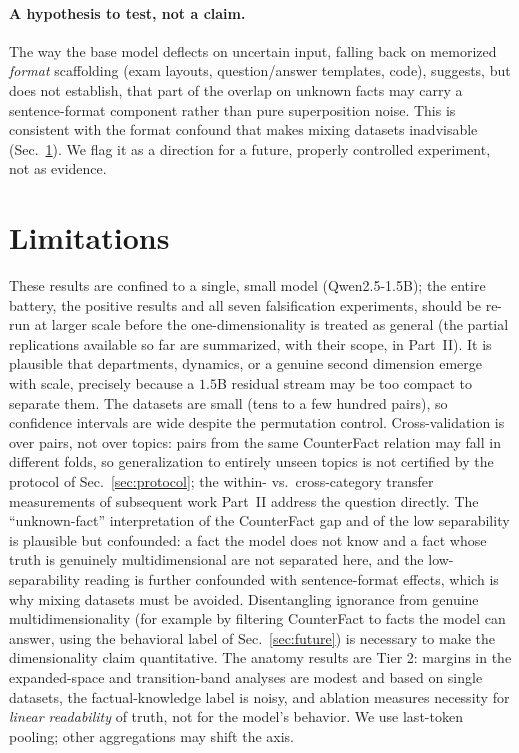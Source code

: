 \documentclass[11pt]{article}
\begin{document}
\paragraph{A hypothesis to test, not a claim.} The way the base model
deflects on uncertain input, falling back on memorized \emph{format}
scaffolding (exam layouts, question/answer templates, code), suggests, but
does not establish, that part of the overlap on unknown facts may carry a
sentence-format component rather than pure superposition noise. This is
consistent with the format confound that makes mixing datasets inadvisable
(Sec.~\ref{sec:limits}). We flag it as a direction for a future, properly
controlled experiment, not as evidence.


\section{Limitations}
\label{sec:limits}

These results are confined to a single, small model (Qwen2.5-1.5B); the
entire battery, the positive results and all seven falsification experiments,
should be re-run at larger scale before the one-dimensionality is treated as
general (the partial replications available so far are summarized, with their
scope, in Part~II). It is plausible that departments,
dynamics, or a genuine second dimension emerge with scale, precisely because
a $1.5$B residual stream may be too compact to separate them. The datasets
are small (tens to a few hundred pairs), so confidence intervals are wide
despite the permutation control. Cross-validation is over pairs, not over
topics: pairs from the same CounterFact relation may fall in different folds,
so generalization to entirely unseen topics is not certified by the protocol
of Sec.~\ref{sec:protocol}; the within- vs.\ cross-category transfer
measurements of subsequent work Part~II
address the question directly. The ``unknown-fact'' interpretation of the
CounterFact gap and of the low separability is plausible but confounded: a
fact the model does not know and a fact whose truth is genuinely
multidimensional are not separated here, and the low-separability reading is
further confounded with sentence-format effects, which is why mixing datasets
must be avoided. Disentangling ignorance from genuine multidimensionality
(for example by filtering CounterFact to facts the model can answer, using
the behavioral label of Sec.~\ref{sec:future}) is necessary to make the
dimensionality claim quantitative. The anatomy results are Tier 2: margins in
the expanded-space and transition-band analyses are modest and based on
single datasets, the factual-knowledge label is noisy, and ablation measures
necessity for \emph{linear readability} of truth, not for the model's
behavior. We use last-token pooling; other aggregations may shift the axis.
\end{document}
